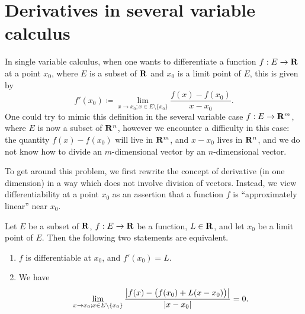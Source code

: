 \section{Derivatives in several variable calculus}\label{sec 6.2}

\begin{note}
    In single variable calculus, when one wants to differentiate a function \(f : E \to \mathbf{R}\) at a point \(x_0\), where \(E\) is a subset of \(\mathbf{R}\) and \(x_0\) is a limit point of \(E\), this is given by
    \[
        f'(x_0) \coloneqq \lim_{x \to x_0 ; x \in E \setminus \{x_0\}} \frac{f(x) - f(x_0)}{x - x_0}.
    \]
    One could try to mimic this definition in the several variable case \(f : E \to \mathbf{R}^m\), where \(E\) is now a subset of \(\mathbf{R}^n\), however we encounter a difficulty in this case:
    the quantity \(f(x) - f(x_0)\) will live in \(\mathbf{R}^m\), and \(x - x_0\) lives in \(\mathbf{R}^n\), and we do not know how to divide an \(m\)-dimensional vector by an \(n\)-dimensional vector.

    To get around this problem, we first rewrite the concept of derivative (in one dimension) in a way which does not involve division of vectors.
    Instead, we view differentiability at a point \(x_0\) as an assertion that a function \(f\) is ``approximately linear'' near \(x_0\).
\end{note}

\begin{lemma}\label{6.2.1}
    Let \(E\) be a subset of \(\mathbf{R}\), \(f : E \to \mathbf{R}\) be a function, \(L \in \mathbf{R}\), and let \(x_0\) be a limit point of \(E\).
    Then the following two statements are equivalent.
    \begin{enumerate}
        \item \(f\) is differentiable at \(x_0\), and \(f'(x_0) = L\).
        \item We have
              \[
                  \lim_{x \to x_0 ; x \in E \setminus \{x_0\}} \frac{\left\lvert f(x) - \big(f(x_0) + L (x - x_0)\big)\right\rvert}{\left\lvert x - x_0\right\rvert} = 0.
              \]
    \end{enumerate}
\end{lemma}

